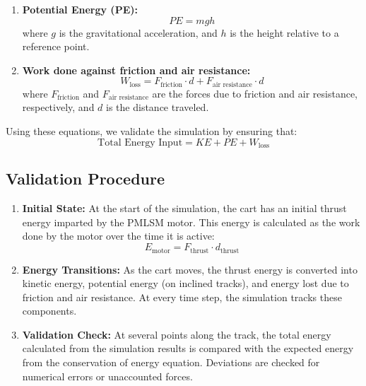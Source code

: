 \documentclass{article}
\begin{document}
\begin{itemize}
\begin{enumerate}
        \item \textbf{Potential Energy (PE):}
            \begin{equation}
                PE = m g h
            \end{equation}
            where $g$ is the gravitational acceleration, and $h$ is the height relative
            to a reference point.

        \item \textbf{Work done against friction and air resistance:}
            \begin{equation}
                W_{\text{loss}}= F_{\text{friction}}\cdot d + F_{\text{air
                resistance}}\cdot d
            \end{equation}
            where $F_{\text{friction}}$ and $F_{\text{air resistance}}$ are the
            forces due to friction and air resistance, respectively, and $d$ is
            the distance traveled.
    \end{enumerate}

    Using these equations, we validate the simulation by ensuring that:
    \begin{equation}
        \text{Total Energy Input}= KE + PE + W_{\text{loss}}
    \end{equation}

    \subsection{Validation Procedure}

    \begin{enumerate}
        \item \textbf{Initial State:} At the start of the simulation, the cart has
            an initial thrust energy imparted by the PMLSM motor. This energy is
            calculated as the work done by the motor over the time it is active:
            \begin{equation}
                E_{\text{motor}}= F_{\text{thrust}}\cdot d_{\text{thrust}}
            \end{equation}

        \item \textbf{Energy Transitions:} As the cart moves, the thrust energy is
            converted into kinetic energy, potential energy (on inclined tracks),
            and energy lost due to friction and air resistance. At every time
            step, the simulation tracks these components.

        \item \textbf{Validation Check:} At several points along the track, the total
            energy calculated from the simulation results is compared with the expected
            energy from the conservation of energy equation. Deviations are
            checked for numerical errors or unaccounted forces.
    \end{enumerate}


\end{itemize}
\end{document}
